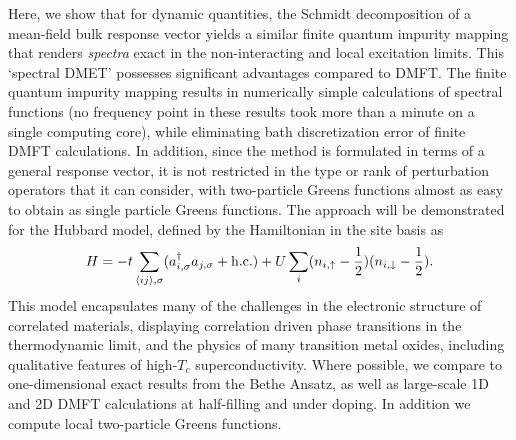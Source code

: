 \documentclass[aps,twocolumn,nobibnotes]{revtex4}
\begin{document}
Here, we show that for dynamic quantities, the Schmidt decomposition of a mean-field bulk response vector yields a similar finite quantum impurity mapping
that renders {\em spectra} exact in the non-interacting and local excitation limits. This `spectral DMET' possesses significant advantages compared to
DMFT. The finite quantum impurity mapping results in numerically simple calculations of spectral functions (no frequency point in these results
took more than a minute on a single computing core), while eliminating bath discretization error of finite DMFT calculations.
In addition, since the method is formulated in terms of a general response vector, it is not restricted in the type or rank of perturbation 
operators that it can consider, with two-particle Greens functions almost as easy to obtain as single particle Greens functions. 
The approach will be demonstrated for the Hubbard model, 
defined by the Hamiltonian in the site basis as
\begin{equation}
H = -t \sum_{\langle ij \rangle, \sigma} (a_{i,\sigma}^{\dagger}a_{j,\sigma} + \text{\textnormal {h.c.}}) + U \sum_i (n_{i,\uparrow} - \frac{1}{2})(n_{i,\downarrow} - \frac{1}{2})  . \label{eqn:hub}
\end{equation}
This model encapsulates many of the challenges in the electronic structure of correlated materials, displaying correlation driven 
phase transitions in the thermodynamic limit, and the physics of many transition metal oxides\cite{Limelette2003}, including qualitative features 
of high-$T_c$ superconductivity\cite{Anderson87,Sordi2012,Millis2013}. Where possible, we compare to one-dimensional exact results from the Bethe 
Ansatz\cite{Lieb68,Ovchinni1970}, as well as large-scale 1D and 2D DMFT calculations at half-filling and under doping\cite{Go2009,Kotliar2008,Masatoshi2009}. 
In addition we compute local two-particle Greens functions.
\end{document}
